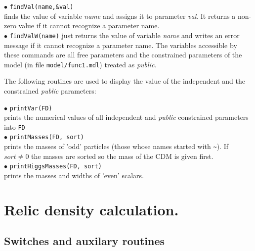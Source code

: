 \documentclass[12pt,a4paper]{article}
\begin{document}
\noindent
$\bullet$ \verb|findVal(name,&val)|\\
 finds the  value of
 variable  {\it name} and assigns it to parameter {\it val}. It returns a non-zero
value  if it cannot recognize  a parameter name. \\
$\bullet$ \verb|findValW(name)| 
just returns the value of variable {\it name} and writes an error message
if it cannot recognize  a parameter name.
The variables accessible by these commands are all free parameters and   the 
constrained parameters of the model (in file \verb|model/func1.mdl|)
treated as {\it public}. 

The following routines are used to display the value of the independent and the constrained 
{\it public}
parameters: 


\noindent
$\bullet$ \verb|printVar(FD)|\\ 
prints the numerical values of all independent and {\it public} 
constrained parameters into \verb|FD|\\
$\bullet$ \verb|printMasses(FD, sort)|\\
 prints the masses of 'odd' particles
(those whose names  started with \verb|~|). If $sort\ne 0$
the masses are sorted so the mass of the CDM is given first.\\
$\bullet$ \verb|printHiggsMasses(FD, sort)|\\
prints the masses and widths of 'even' scalars.\\


\section{Relic density calculation.}
\subsection{Switches and auxilary routines}
\end{document}
